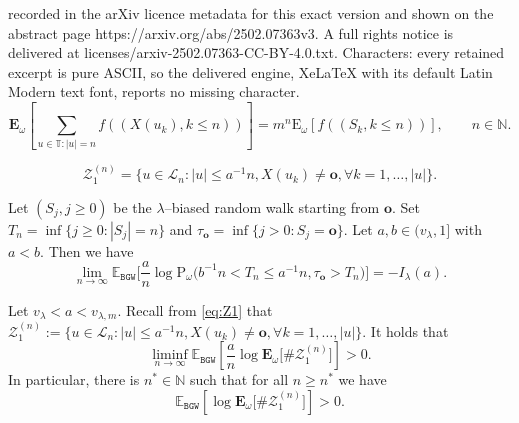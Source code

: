 \documentclass[10pt,a4paper]{amsart}
\newcommand{\EE}{\mathbb{E}} %
\newcommand{\Ew}{\mathbf{E}_{\omega}} %
\newcommand{\NN}{\mathbb{N}}
\newcommand{\Pws}{\mathrm{P}_{\omega}} %
\newcommand{\rt}{\mathbf{o}} %
\begin{document}
recorded in the arXiv licence metadata for this exact version and shown on the abstract page https://arxiv.org/abs/2502.07363v3. A full rights notice is delivered at licenses/arxiv-2502.07363-CC-BY-4.0.txt. Characters: every retained excerpt is pure ASCII, so the delivered engine, XeLaTeX with its default Latin Modern text font, reports no missing character.
\begin{equation}\label{eq:many_to_one}
	\mathbf{E}_{\omega}\left[\sum_{u\in \mathbb{T}\colon\vert u \vert = n} f\left((X(u_k), k\leq n) \right)\right] = m^n \mathrm{E}_{\omega} \left[ f\left((S_k, k\leq n) \right) \right], \qquad n\in \NN.
\end{equation}

\begin{equation}\label{eq:Z1}
\mathcal{Z}^{(n)}_{1} = \{u\in  \mathcal{L}_n \colon |u| \le a^{-1} n,X(u_k)\ne \rt, \forall k= 1,\ldots, |u|   \} . 
\end{equation}

\begin{lemma}\label{lem:log0-bis}
	Let $(S_j, j\ge 0)$ be the $\lambda$--biased random walk starting from $\rt$. Set $T_n = \inf\{j\ge 0\colon |S_j|=n  \}$ and $\tau_{\rt} = \inf\{j > 0\colon S_j = \rt  \}$. 
	Let $a,b\in (v_{\lambda}, 1]$ with $a<b$. 
	Then we have 
	\begin{equation*}
		\lim_{n\to \infty} \EE_{\mathtt{BGW}}  \Big[ \frac{a}{n}\log  \Pws\big( b^{-1} n< T_{n} \le a^{-1}  n, \tau_\rt >T_{n}  \big)  \Big]  = - I_{\lambda}(a). 
	\end{equation*}
\end{lemma}

\begin{lemma}\label{lem:log}
  	Let  $v_{\lambda} < a< v_{\lambda, m}$. 
  		Recall from \eqref{eq:Z1} that $\mathcal{Z}^{(n)}_1:= \{u\in \mathcal{L}_n \colon |u| \le a^{-1} n,X(u_k)\ne \rt, \forall k= 1,\ldots, |u| \} $. 
  	It holds that
	\begin{equation}
	\liminf_{n\to \infty}\EE_{\mathtt{BGW}} \left[\frac{a}{n}\log \Ew\big[\# \mathcal{Z}^{(n)}_1 \big] \right] >0.
	\end{equation}
	In particular, there is $n^* \in \NN$ such that for all $n\geq n^*$ we have
	\begin{equation}\label{eq:lem:log}
	\EE_{\mathtt{BGW}} \left[\log \Ew\big[	\# \mathcal{Z}^{(n)}_1   \big] \right] >0. 
	\end{equation}
\end{lemma}
\end{document}
